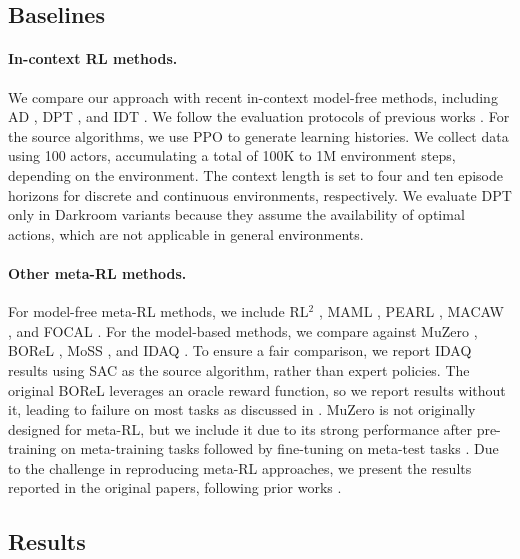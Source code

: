 \documentclass{article}
\begin{document}
\subsection{Baselines}

\paragraph*{In-context RL methods.}
We compare our approach with recent in-context model-free methods, including AD \citep{AD}, DPT \citep{DPT}, and IDT \citep{IDT}.
We follow the evaluation protocols of previous works \citep{AD, IDT}.
For the source algorithms, we use PPO \citep{PPO} to generate learning histories.
We collect data using 100 actors, accumulating a total of 100K to 1M environment steps, depending on the environment.
The context length is set to four and ten episode horizons for discrete and continuous environments, respectively.
We evaluate DPT only in Darkroom variants because they assume the availability of optimal actions, which are not applicable in general environments.

\paragraph*{Other meta-RL methods.}
For model-free meta-RL methods, we include RL$^2$ \citep{RL2}, MAML \citep{MAML}, PEARL \citep{PEARL}, MACAW \citep{MACAW}, and FOCAL \citep{FOCAL}.
For the model-based methods, we compare against MuZero \citep{MuZero}, BOReL \citep{BOReL}, MoSS \citep{MoSS}, and IDAQ \citep{IDAQ}.
To ensure a fair comparison, we report IDAQ results using SAC as the source algorithm, rather than expert policies.
The original BOReL leverages an oracle reward function, so we report results without it, leading to failure on most tasks as discussed in \citet{BOReL, IDAQ}.
MuZero is not originally designed for meta-RL, but we include it due to its strong performance after pre-training on meta-training tasks followed by fine-tuning on meta-test tasks \citep{ProcGenMuZero}.
Due to the challenge in reproducing meta-RL approaches, we present the results reported in the original papers, following prior works \citep{ProcGenMuZero, MoSS}.


\subsection{Results}
\end{document}

